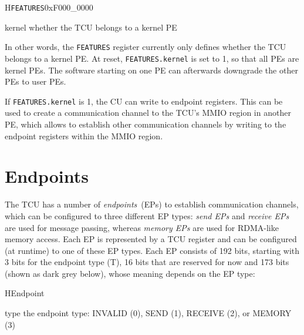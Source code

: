 \documentclass[a4paper,11pt]{article}
\begin{document}
\setlength{\regWidth}{.95\textwidth}
\begin{register}{H}{\texttt{FEATURES}}{0xF000\_0000}
  \regnewline%
  \begin{regdesc}\begin{reglist}
    \item[kernel] whether the TCU belongs to a kernel PE
  \end{reglist}\end{regdesc}
\end{register}
\setlength{\regWidth}{\textwidth}

\noindent In other words, the \texttt{FEATURES} register currently only defines whether the TCU
belongs to a kernel PE. At reset, \texttt{FEATURES.kernel} is set to 1, so that all PEs are kernel
PEs. The software starting on one PE can afterwards downgrade the other PEs to user PEs.

If \texttt{FEATURES.kernel} is 1, the CU can write to endpoint registers. This can be used to create
a communication channel to the TCU's MMIO region in another PE, which allows to establish other
communication channels by writing to the endpoint registers within the MMIO region.

\section{Endpoints}

The TCU has a number of \emph{endpoints}~(EPs) to establish communication channels, which can be
configured to three different EP types: \emph{send EPs} and \emph{receive EPs} are used for message
passing, whereas \emph{memory EPs} are used for RDMA-like memory access. Each EP is represented by a
TCU register and can be configured (at runtime) to one of these EP types. Each EP consists of 192
bits, starting with 3 bits for the endpoint type (T), 16 bits that are reserved for now and
173 bits (shown as dark grey below), whose meaning depends on the EP type:\\[.1em]

\begin{register}{H}{Endpoint}{}
  \regnewline%
  \regnewline%
  \regnewline%
  \begin{regdesc}\begin{reglist}
    \item[type] the endpoint type: INVALID (0), SEND (1), RECEIVE (2), or MEMORY (3)
  \end{reglist}\end{regdesc}
\end{register}
\end{document}
